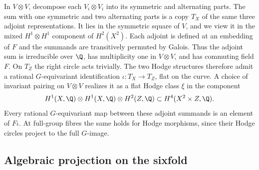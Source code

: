In \(V\otimes V\), decompose each \(V_i\otimes V_i\) into its symmetric and alternating parts. The sum with one symmetric and two alternating parts is a copy \(T_X\) of the same three adjoint representations. It lies in the symmetric square of \(V\), and we view it in the mixed \(H^1\otimes H^1\) component of \(H^2(X^2)\). Each adjoint is defined at an embedding of \(F\) and the summands are transitively permuted by Galois. Thus the adjoint sum is irreducible over \(\Q\), has multiplicity one in \(V\otimes V\), and has commuting field \(F\). On \(T_Z\) the right circle acts trivially. The two Hodge structures therefore admit a rational \(G\)-equivariant identification \(\iota:T_X\to T_Z\), flat on the curve. A choice of invariant pairing on \(V\otimes V\) realizes it as a flat Hodge class \(\xi\) in the component
\[
 H^1(X,\Q)\otimes H^1(X,\Q)\otimes H^2(Z,\Q)
 \subset H^4(X^2\times Z,\Q).
\]
Every rational \(G\)-equivariant map between these adjoint summands is an element of \(F\iota\). At full-group fibres the same holds for Hodge morphisms, since their Hodge circles project to the full \(G\)-image.

\subsection{Algebraic projection on the sixfold}\label{v7:sec:projector}

